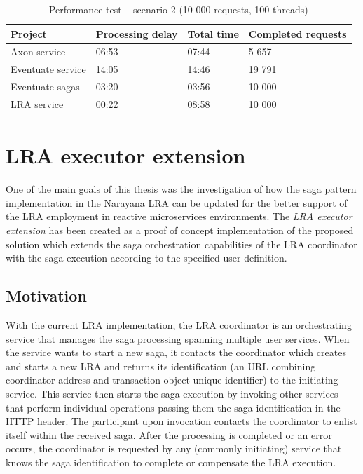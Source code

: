\documentclass[oneside,
  digital, %
  table,   %
  nolof,     %
  nolot,     %
]{fithesis3}
\begin{document}
\begin{table}[h]
    \begin{tabularx}{\textwidth}{lXXX}
        \toprule
        Project & Processing delay & Total time & Completed requests \\
        \midrule
        Axon service & 06:53 & 07:44 & 5 657 \\
        Eventuate service & 14:05 & 14:46 & 19 791 \\
        Eventuate sagas & 03:20 & 03:56 & 10 000 \\
        LRA service & 00:22 & 08:58 & 10 000 \\
        \bottomrule
    \end{tabularx}
    \caption{Performance test -- scenario 2 (10 000 requests, 100 threads)}
    \label{tab:performance-scenario-2}
\end{table}

\clearpage
\chapter{LRA executor extension}

One of the main goals of this thesis was the investigation of how the saga pattern implementation in the Narayana LRA can be updated for the better support of the LRA employment in reactive microservices environments. The \textit{LRA executor extension} has been created as a proof of concept implementation of the proposed solution which extends the saga orchestration capabilities of the LRA coordinator with the saga execution according to the specified user definition.

\section{Motivation}

With the current LRA implementation, the LRA coordinator is an orchestrating service that manages the saga processing spanning multiple user services. When the service wants to start a new saga, it contacts the coordinator which creates and starts a new LRA and returns its identification (an URL combining coordinator address and transaction object unique identifier) to the initiating service. This service then starts the saga execution by invoking other services that perform individual operations passing them the saga identification in the HTTP header. The participant upon invocation contacts the coordinator to enlist itself within the received saga. After the processing is completed or an error occurs, the coordinator is requested by any (commonly initiating) service that knows the saga identification to complete or compensate the LRA execution.
\end{document}

